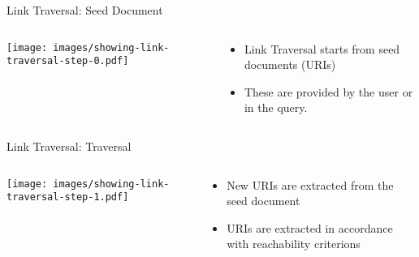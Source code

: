 
\begin{frame}{Link Traversal: Seed Document}
    \begin{columns}[T] %
        \begin{column}{0.6\textwidth} %
            \texttt{[image: images/showing-link-traversal-step-0.pdf]} %
        \end{column}

        \begin{column}{0.4\textwidth} %
            \begin{itemize}
                \item Link Traversal starts from seed documents (URIs)
                \item These are provided by the user or in the query.
            \end{itemize}
        \end{column}
    \end{columns}
\end{frame}

\begin{frame}{Link Traversal: Traversal}
    \begin{columns}[T] %
        \begin{column}{0.6\textwidth} %
            \texttt{[image: images/showing-link-traversal-step-1.pdf]} %
        \end{column}

        \begin{column}{0.4\textwidth} %
            \begin{itemize}
                \item New URIs are extracted from the seed document
                \item URIs are extracted in accordance with reachability criterions
            \end{itemize}
        \end{column}
    \end{columns}
\end{frame}


